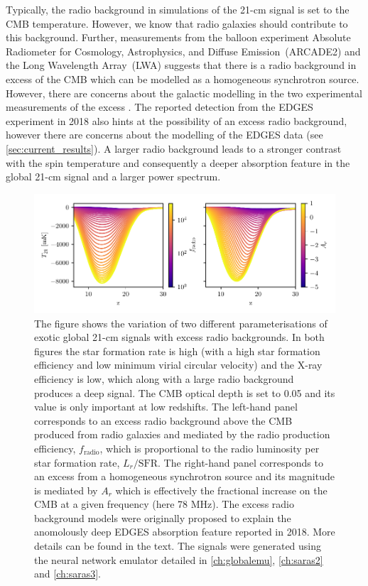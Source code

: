 Typically, the radio background in simulations of the 21-cm signal is set to the CMB temperature. However, we know that radio galaxies should contribute to this background. Further, measurements from the balloon experiment Absolute Radiometer for Cosmology, Astrophysics, and Diffuse Emission~(ARCADE2) \cite{fixsen_arcade_2011} and the Long Wavelength Array~(LWA) \cite{dowell_radio_2018} suggests that there is a radio background in excess of the CMB which can be modelled as a homogeneous synchrotron source. However, there are concerns about the galactic modelling in the two experimental measurements of the excess \cite{Subrahmanyan2013}. The reported detection from the EDGES experiment in 2018 also hints at the possibility of an excess radio background, however there are concerns about the modelling of the EDGES data (see \cref{sec:current_results}). A larger radio background leads to a stronger contrast with the spin temperature and consequently a deeper absorption feature in the global 21-cm signal and a larger power spectrum.

\begin{figure}
    \centering
    \includegraphics{introduction/figs/backgrounds_variation.pdf}
    \caption{The figure shows the variation of two different parameterisations of  exotic global 21-cm signals with excess radio backgrounds. In both figures the star formation rate is high (with a high star formation efficiency and low minimum virial circular velocity) and the X-ray efficiency is low, which along with a large radio background produces a deep signal. The CMB optical depth is set to 0.05 and its value is only important at low redshifts. The left-hand panel corresponds to an excess radio background above the CMB produced from radio galaxies and mediated by the radio production efficiency, $f_\mathrm{radio}$, which is proportional to the radio luminosity per star formation rate, $L_r/\mathrm{SFR}$. The right-hand panel corresponds to an excess from a homogeneous synchrotron source and its magnitude is mediated by $A_r$ which is effectively the fractional increase on the CMB at a given frequency (here 78 MHz). The excess radio background models were originally proposed to explain the anomolously deep EDGES absorption feature reported in 2018. More details can be found in the text. The signals were generated using the neural network emulator detailed in \cref{ch:globalemu}, \cref{ch:saras2} and \cref{ch:saras3}.}
    \label{fig:radio_parameters}
\end{figure}

